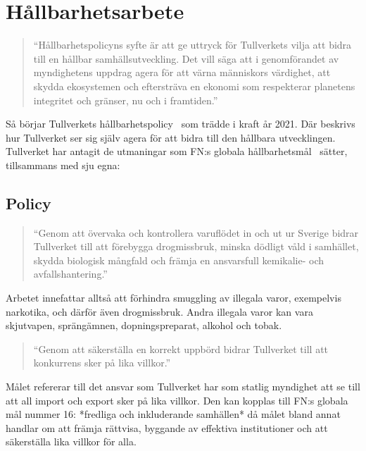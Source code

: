 \section{Hållbarhetsarbete}

\begin{quotation}
    ``Hållbarhetspolicyns syfte är att ge uttryck för Tullverkets vilja att
    bidra till en hållbar samhällsutveckling. Det vill säga att i genomförandet
    av myndighetens uppdrag agera för att värna människors värdighet, att
    skydda ekosystemen och eftersträva en ekonomi som respekterar planetens
    integritet och gränser, nu och i framtiden.''
\end{quotation}

Så börjar Tullverkets hållbarhetspolicy~\cite{policy2021} som trädde i kraft år
2021. Där beskrivs hur Tullverket ser sig själv agera för att bidra till den
hållbara utvecklingen. Tullverket har antagit de utmaningar som FN:s globala
hållbarhetsmål~\cite{fnmal} sätter, tillsammans med sju egna:

\subsection{Policy}

\begin{quotation}
    ``Genom att övervaka och kontrollera varuflödet in och ut ur Sverige bidrar
    Tullverket till att förebygga drogmissbruk, minska dödligt våld i
    samhället, skydda biologisk mångfald och främja en ansvarsfull kemikalie-
    och avfallshantering.''
\end{quotation}

Arbetet innefattar alltså att förhindra smuggling av illegala varor, exempelvis
narkotika, och därför även drogmissbruk. Andra illegala varor kan vara
skjutvapen, sprängämnen, dopningspreparat, alkohol och tobak.

\begin{quotation}
    ``Genom att säkerställa en korrekt uppbörd bidrar Tullverket till att
    konkurrens sker på lika villkor.''
\end{quotation}

Målet refererar till det ansvar som Tullverket har som statlig myndighet att
se till att all import och export sker på lika villkor. Den kan kopplas till
FN:s globala mål nummer 16: *fredliga och inkluderande samhällen* då målet
bland annat handlar om att främja rättvisa, byggande av effektiva institutioner
och att säkerställa lika villkor för alla. 

